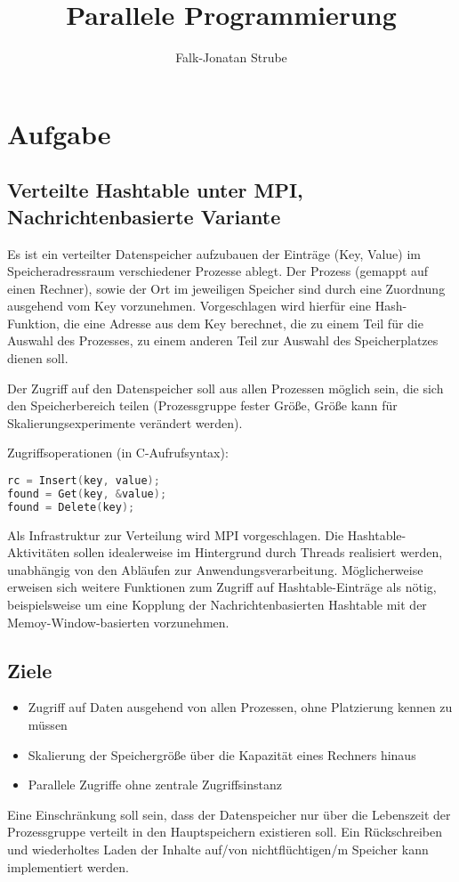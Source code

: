 \documentclass{scrreprt}
\title{Parallele Programmierung}
\author{Falk-Jonatan Strube}
\begin{document}
\maketitle
{}
\tableofcontents


\chapter{Aufgabe}
\section{Verteilte Hashtable  unter MPI,  Nachrichtenbasierte Variante}
Es ist ein verteilter Datenspeicher aufzubauen der Einträge (Key, Value) im Speicheradressraum verschiedener Prozesse ablegt. Der Prozess (gemappt auf einen Rechner), sowie der Ort im jeweiligen Speicher sind durch eine Zuordnung ausgehend vom Key vorzunehmen. Vorgeschlagen wird hierfür eine Hash-Funktion, die eine Adresse aus dem Key berechnet, die zu einem Teil für die Auswahl des Prozesses, zu einem anderen Teil zur Auswahl des Speicherplatzes dienen soll.

Der Zugriff auf den Datenspeicher soll aus allen Prozessen möglich sein, die sich den Speicherbereich teilen (Prozessgruppe fester Größe, Größe kann für Skalierungsexperimente verändert werden).

Zugriffsoperationen  (in C-Aufrufsyntax): 

\begin{lstlisting}[language=C]
rc = Insert(key, value);
found = Get(key, &value);
found = Delete(key);
\end{lstlisting}

Als Infrastruktur zur Verteilung wird MPI vorgeschlagen. Die Hashtable-Aktivitäten sollen idealerweise im Hintergrund durch Threads realisiert werden, unabhängig von den Abläufen zur Anwendungsverarbeitung. Möglicherweise erweisen sich weitere Funktionen zum Zugriff auf Hashtable-Einträge als nötig, beispielsweise um eine Kopplung der Nachrichtenbasierten Hashtable mit der Memoy-Window-basierten vorzunehmen.

\clearpage
\section{Ziele}
\begin{itemize}
\item Zugriff auf Daten ausgehend von allen Prozessen, ohne Platzierung kennen zu müssen
\item Skalierung der Speichergröße über die Kapazität eines Rechners hinaus
\item Parallele Zugriffe ohne zentrale Zugriffsinstanz
\end{itemize}
Eine Einschränkung soll sein, dass der Datenspeicher nur über die Lebenszeit der Prozessgruppe verteilt in den Hauptspeichern existieren soll. Ein Rückschreiben und wiederholtes Laden der Inhalte auf/von nichtflüchtigen/m Speicher kann implementiert werden.
\end{document}
